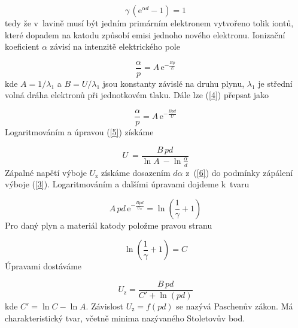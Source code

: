\documentclass[a4paper,12pt]{article}
\newcommand{\e}{\text{e}}
\begin{document}
\begin{equation}
	\gamma\,(\e^{\alpha d } - 1) = 1
	\label{3}
\end{equation} 
tedy že v~lavině musí být jedním primárním elektronem vytvořeno tolik iontů, 
které dopadem na katodu způsobí emisi jednoho nového elektronu. Ionizační 
koeficient $\alpha$ závisí na intenzitě elektrického pole 

\begin{equation}
	\frac{\alpha}{p} = A\,\e^{-\frac{Bp}{E}} 
	\label{4}
\end{equation}
kde $A = 1/\lambda_1$ a $B = U/\lambda_1$ jsou konstanty závislé na druhu 
plynu, $\lambda_1$ je střední volná dráha elektronů při jednotkovém tlaku. Dále 
lze (\ref{4}) přepsat jako

\begin{equation}
	\frac{\alpha}{p} = A\,\e^{-\frac{Bpd}{U}} 
	\label{5}
\end{equation}
Logaritmováním a úpravou (\ref{5}) získáme

\begin{equation}
	U~= \frac{B\,pd}{\ln A~- \ln \frac{\alpha}{d}}
	\label{6}
\end{equation}
Zápalné napětí výboje $U_\text{z}$ získáme dosazením $d\alpha$ z~(\ref{6}) do 
podmínky zápálení výboje (\ref{3}). Logaritmováním a dalšími úpravami 
dojdeme k~tvaru

\begin{equation}
	A\,pd\,\e^{-\frac{Bpd}{U_\text{z}}} = \ln \left(\frac{1}{\gamma} + 1\right)
	\label{7}
\end{equation}
Pro daný plyn a materiál katody položme pravou stranu

\begin{equation}
	\ln \left(\frac{1}{\gamma} + 1\right) = C
	\label{8}
\end{equation}
Úpravami dostáváme

\begin{equation}
	U_\text{z} = \frac{B\,pd}{C' + \ln(pd)}
	\label{9}
\end{equation}
kde $C' = \ln C - \ln A$. Závislost $U_\text{z} = f (pd)$ se nazývá Paschenův 
zákon. 
Má charakteristický tvar, včetně minima nazývaného Stoletovův bod.
\end{document}
